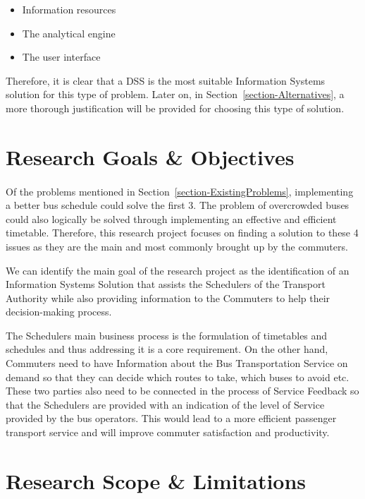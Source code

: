 \documentclass[12pt, oneside]{report}
\begin{document}
\begin {itemize}
\item Information resources
\item The analytical engine
\item The user interface
\end {itemize}

Therefore, it is clear that a DSS is the most suitable Information Systems solution for this type of problem. Later on, in Section~\ref{section-Alternatives}, a more thorough justification will be provided for choosing this type of solution.

\newpage

\section{Research Goals \& Objectives}
\label{section-ResearchGoalsAndObjectives}

\paragraph{ } Of the problems mentioned in Section~\ref{section-ExistingProblems}, implementing a better bus schedule could solve the first 3. The problem of overcrowded buses could also logically be solved through implementing an effective and efficient timetable. Therefore, this research project focuses on finding a solution to these 4 issues as they are the main and most commonly brought up by the commuters.

We can identify the main goal of the research project as the identification of an Information Systems Solution that assists the Schedulers of the Transport Authority while also providing information to the Commuters to help their decision-making process. 

The Schedulers main business process is the formulation of timetables and schedules and thus addressing it is a core requirement. On the other hand, Commuters need to have Information about the Bus Transportation Service on demand so that they can decide which routes to take, which buses to avoid etc. These two parties also need to be connected in the process of Service Feedback so that the Schedulers are provided with an indication of the level of Service provided by the bus operators. This would lead to a more efficient passenger transport service and will improve commuter satisfaction and productivity.

\section{Research Scope \& Limitations}
\label{section-ResearchScope}
\end{document}
